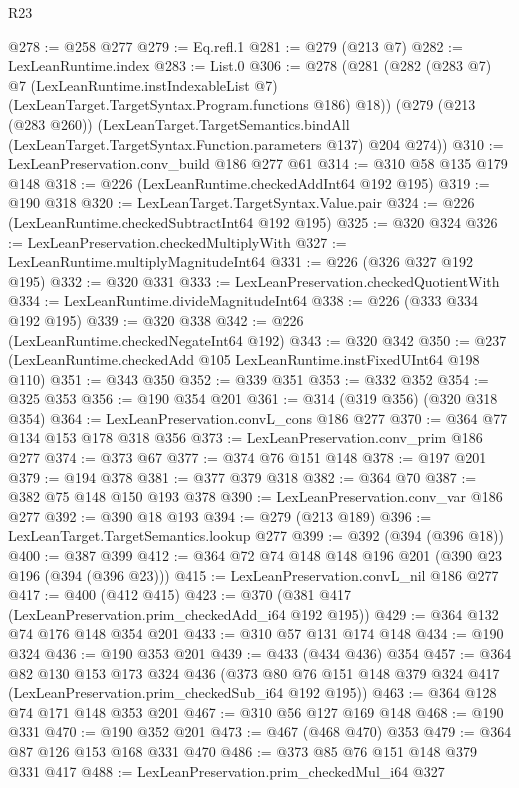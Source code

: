 \begin{lexlean}{R23}
\begin{coremodule}
{{{{{@278 := @258 @277
@279 := Eq.refl.{1}
@281 := @279 (@213 @7)
@282 := LexLeanRuntime.index
@283 := List.{0}
@306 := @278
    (@281
      (@282
        (@283 @7)
        @7
        (LexLeanRuntime.instIndexableList @7)
        (LexLeanTarget.TargetSyntax.Program.functions @186)
        @18))
    (@279
      (@213 (@283 @260))
      (LexLeanTarget.TargetSemantics.bindAll
        (LexLeanTarget.TargetSyntax.Function.parameters @137)
        @204
        @274))
@310 := LexLeanPreservation.conv_build @186 @277 @61
@314 := @310 @58 @135 @179 @148
@318 := @226 (LexLeanRuntime.checkedAddInt64 @192 @195)
@319 := @190 @318
@320 := LexLeanTarget.TargetSyntax.Value.pair
@324 := @226 (LexLeanRuntime.checkedSubtractInt64 @192 @195)
@325 := @320 @324
@326 := LexLeanPreservation.checkedMultiplyWith
@327 := LexLeanRuntime.multiplyMagnitudeInt64
@331 := @226 (@326 @327 @192 @195)
@332 := @320 @331
@333 := LexLeanPreservation.checkedQuotientWith
@334 := LexLeanRuntime.divideMagnitudeInt64
@338 := @226 (@333 @334 @192 @195)
@339 := @320 @338
@342 := @226 (LexLeanRuntime.checkedNegateInt64 @192)
@343 := @320 @342
@350 := @237 (LexLeanRuntime.checkedAdd @105 LexLeanRuntime.instFixedUInt64 @198 @110)
@351 := @343 @350
@352 := @339 @351
@353 := @332 @352
@354 := @325 @353
@356 := @190 @354 @201
@361 := @314 (@319 @356) (@320 @318 @354)
@364 := LexLeanPreservation.convL_cons @186 @277
@370 := @364 @77 @134 @153 @178 @318 @356
@373 := LexLeanPreservation.conv_prim @186 @277
@374 := @373 @67
@377 := @374 @76 @151 @148
@378 := @197 @201
@379 := @194 @378
@381 := @377 @379 @318
@382 := @364 @70
@387 := @382 @75 @148 @150 @193 @378
@390 := LexLeanPreservation.conv_var @186 @277
@392 := @390 @18 @193
@394 := @279 (@213 @189)
@396 := LexLeanTarget.TargetSemantics.lookup @277
@399 := @392 (@394 (@396 @18))
@400 := @387 @399
@412 := @364 @72 @74 @148 @148 @196 @201 (@390 @23 @196 (@394 (@396 @23)))
@415 := LexLeanPreservation.convL_nil @186 @277
@417 := @400 (@412 @415)
@423 := @370 (@381 @417 (LexLeanPreservation.prim_checkedAdd_i64 @192 @195))
@429 := @364 @132 @74 @176 @148 @354 @201
@433 := @310 @57 @131 @174 @148
@434 := @190 @324
@436 := @190 @353 @201
@439 := @433 (@434 @436) @354
@457 := @364
    @82
    @130
    @153
    @173
    @324
    @436
    (@373 @80 @76 @151 @148 @379 @324 @417 (LexLeanPreservation.prim_checkedSub_i64 @192 @195))
@463 := @364 @128 @74 @171 @148 @353 @201
@467 := @310 @56 @127 @169 @148
@468 := @190 @331
@470 := @190 @352 @201
@473 := @467 (@468 @470) @353
@479 := @364 @87 @126 @153 @168 @331 @470
@486 := @373 @85 @76 @151 @148 @379 @331 @417
@488 := LexLeanPreservation.prim_checkedMul_i64 @327
}}}}}
\end{coremodule}
\end{lexlean}
